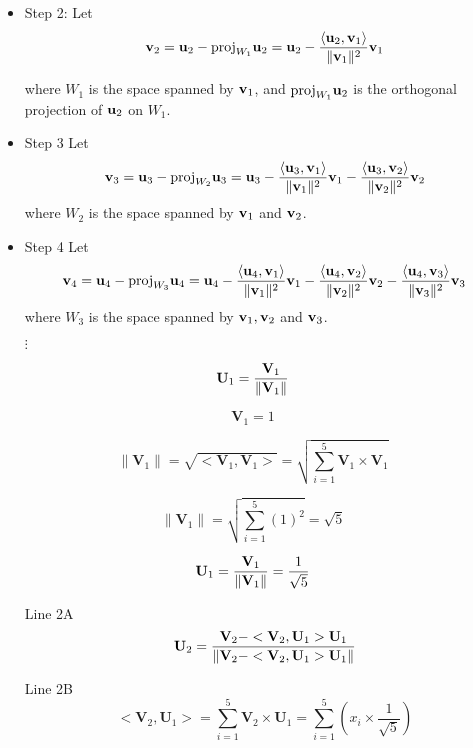 \documentclass[12pt, a4paper]{report}
\theoremstyle{plain}
\theoremstyle{definition}
\theoremstyle{remark}
\begin{document}
{{\begin{itemize}
\item Step 2: Let \[ {\bf v}_2={\bf u}_2 - \mbox{proj}_{W_{1}}{\bf
		u}_2 = {\bf u}_2 - \frac{\langle {\bf u}_2,{\bf v}_1\rangle}{\| {\bf v}_1 \|^{2}}{\bf v}_1\]
		
		where $W_1$ is the space spanned by ${\bf v}_1$, and
		$\mbox{proj}_{W_{1}}{\bf u}_2$ is the orthogonal projection of ${\bf
		u}_2$ on $W_1$.

\item Step 3 Let \[ {\bf v}_3 = {\bf u}_3 -
		\mbox{proj}_{W_{2}} {\bf u}_3 = {\bf u}_3- \frac{\langle
		{\bf u}_3,{\bf v}_1\rangle}{\| {\bf v}_1 \|^{2}}{\bf v}_1 - \frac{\langle
		{\bf u}_3,{\bf v}_2\rangle}{\| {\bf v}_2 \|^{2}}{\bf v}_2 \] where $W_2$ is
		the space spanned by ${\bf v}_1$ and ${\bf v}_2$.		
		
\item Step 4 Let \[{\bf v}_4 = {\bf u}_4 -
		\mbox{proj}_{W_{3}} {\bf u}_4 = {\bf u}_4- \frac{\langle
		{\bf u}_4,{\bf v}_1\rangle}{\| {\bf v}_1 \|^{2}}{\bf v}_1 - \frac{\langle
		{\bf u}_4,{\bf v}_2\rangle}{\| {\bf v}_2 \|^{2}}{\bf v}_2 - \frac{\langle
		{\bf u}_4,{\bf v}_3\rangle}{\| {\bf v}_3 \|^{2}}{\bf v}_3\] where $W_3$ is
		the space spanned by ${\bf v}_1, {\bf v}_2$ and ${\bf v}_3$.

 $\vdots$
\end{itemize}

}

\newpage
{
\Large

\[ \mathbf{U}_1  = {\mathbf{V}_1 \over \|\mathbf{V}_1\|} \]

\[\mathbf{V}_1 = 1\]

 \[\|\mathbf{V}_1\| = \sqrt{<\mathbf{V}_1,\mathbf{V}_1>} = \sqrt{\sum_{i=1}^{5} \mathbf{V}_1 \times \mathbf{V}_1}\]

 \[\|\mathbf{V}_1\|  = \sqrt{\sum_{i=1}^{5} (1)^2} = \sqrt{5}\]

 \[ \mathbf{U}_1  = {\mathbf{V}_1 \over \|\mathbf{V}_1\|} = \frac{1}{\sqrt{5}} \]
\newpage

\begin{itemize}
\item[Line 2A]
\[ \mathbf{U}_2  = {\mathbf{V}_2 - <\mathbf{V}_2,\mathbf{U}_1>\mathbf{U}_1 \over \|\mathbf{V}_2 - <\mathbf{V}_2,\mathbf{U}_1>\mathbf{U}_1\|} \]
\item[Line 2B]
\[ <\mathbf{V}_2,\mathbf{U}_1> = \sum_{i=1}^{5}  \mathbf{V}_2 \times \mathbf{U}_1 = \sum_{i=1}^{5} \left(x_i \times \frac{1}{\sqrt{5}} \right) \]


\end{itemize}}}
\end{document}
